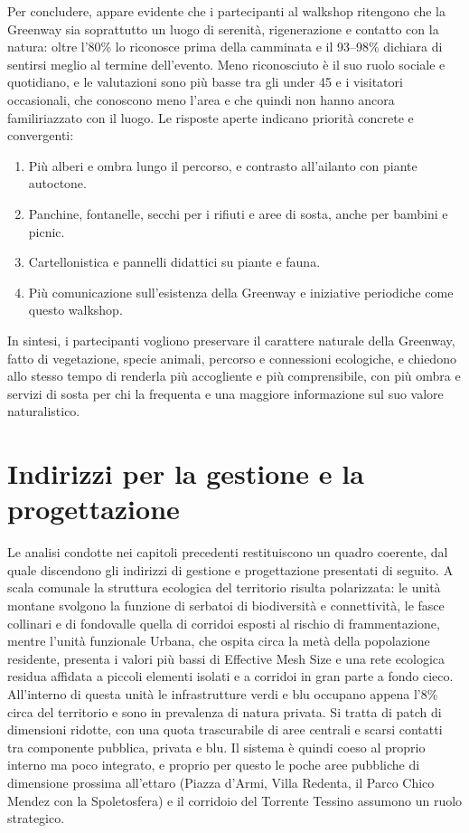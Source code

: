 \documentclass[
  a4paper,
]{book}
\providecommand{\tightlist}{%
  \setlength{\itemsep}{0pt}\setlength{\parskip}{0pt}}
\begin{document}
Per concludere, appare evidente che i partecipanti al walkshop ritengono che la Greenway sia soprattutto un luogo di serenità, rigenerazione e contatto con la natura: oltre l'80\% lo riconosce prima della camminata e il 93--98\% dichiara di sentirsi meglio al termine dell'evento.
Meno riconosciuto è il suo ruolo sociale e quotidiano, e le valutazioni sono più basse tra gli under 45 e i visitatori occasionali, che conoscono meno l'area e che quindi non hanno ancora familiriazzato con il luogo.
Le risposte aperte indicano priorità concrete e convergenti:

\begin{enumerate}
\def\labelenumi{\arabic{enumi}.}
\tightlist
\item
  Più alberi e ombra lungo il percorso, e contrasto all'ailanto con piante autoctone.
\item
  Panchine, fontanelle, secchi per i rifiuti e aree di sosta, anche per bambini e picnic.
\item
  Cartellonistica e pannelli didattici su piante e fauna.
\item
  Più comunicazione sull'esistenza della Greenway e iniziative periodiche come questo walkshop.
\end{enumerate}

In sintesi, i partecipanti vogliono preservare il carattere naturale della Greenway, fatto di vegetazione, specie animali, percorso e connessioni ecologiche, e chiedono allo stesso tempo di renderla più accogliente e più comprensibile, con più ombra e servizi di sosta per chi la frequenta e una maggiore informazione sul suo valore naturalistico.

\chapter{Indirizzi per la gestione e la progettazione}\label{indirizzi-per-la-gestione-e-la-progettazione}

Le analisi condotte nei capitoli precedenti restituiscono un quadro coerente, dal quale discendono gli indirizzi di gestione e progettazione presentati di seguito.
A scala comunale la struttura ecologica del territorio risulta polarizzata: le unità montane svolgono la funzione di serbatoi di biodiversità e connettività, le fasce collinari e di fondovalle quella di corridoi esposti al rischio di frammentazione, mentre l'unità funzionale Urbana, che ospita circa la metà della popolazione residente, presenta i valori più bassi di Effective Mesh Size e una rete ecologica residua affidata a piccoli elementi isolati e a corridoi in gran parte a fondo cieco.
All'interno di questa unità le infrastrutture verdi e blu occupano appena l'8\% circa del territorio e sono in prevalenza di natura privata.
Si tratta di patch di dimensioni ridotte, con una quota trascurabile di aree centrali e scarsi contatti tra componente pubblica, privata e blu.
Il sistema è quindi coeso al proprio interno ma poco integrato, e proprio per questo le poche aree pubbliche di dimensione prossima all'ettaro (Piazza d'Armi, Villa Redenta, il Parco Chico Mendez con la Spoletosfera) e il corridoio del Torrente Tessino assumono un ruolo strategico.
\end{document}
